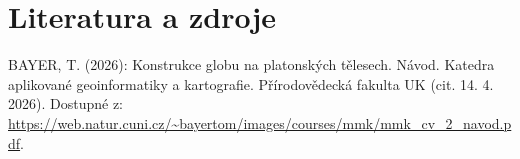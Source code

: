 \section{Literatura a zdroje}

BAYER, T. (2026): Konstrukce globu na platonských tělesech. Návod.
Katedra aplikované geoinformatiky a kartografie. Přírodovědecká fakulta UK (cit. 14. 4. 2026). Dostupné z: \url{https://web.natur.cuni.cz/~bayertom/images/courses/mmk/mmk_cv_2_navod.pdf}.
